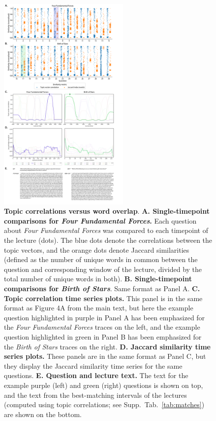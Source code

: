 \documentclass[10pt]{article}
\begin{document}
\begin{figure}[tp]
    \centering
    \includegraphics[width=0.57\textwidth]{figs/word-overlap-comparison}

    \caption{\textbf{Topic correlations versus word overlap}. \textbf{A.
    Single-timepoint comparisons for \textit{Four Fundamental Forces}.} Each
    question about \textit{Four Fundamental Forces} was compared to each
    timepoint of the lecture (dots). The blue dots denote the correlations
    between the topic vectors, and the orange dots denote Jaccard similarities
    (defined as the number of unique words in common between the question and
    corresponding window of the lecture, divided by the total number of unique
    words in both). \textbf{B. Single-timepoint comparisons for \textit{Birth
    of Stars}}. Same format as Panel A. \textbf{C. Topic correlation time series
    plots.} This panel is in the same format as Figure 4A from the main text,
    but here the example question highlighted in purple in Panel A has been
    emphasized for the \textit{Four Fundamental Forces} traces on the left, and
    the example question highlighted in green in Panel B has been emphasized
    for the \textit{Birth of Stars} traces on the right. \textbf{D. Jaccard
    similarity time series plots.} These panels are in the same format as Panel
    C, but they display the Jaccard similarity time series for the same
    questions. \textbf{E. Question and lecture text.} The text for the example
    purple (left) and green (right) questions is shown on top, and the text
    from the best-matching intervals of the lectures (computed using topic
    correlations; see Supp.~Tab.~\ref{tab:matches}) are shown on the bottom.}


    \label{fig:compare-wordcount}
\end{figure}
\end{document}

